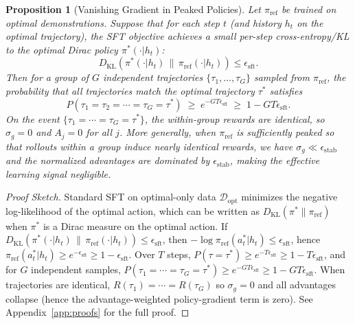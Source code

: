 \documentclass{article}
\theoremstyle{plain}
\newtheorem{proposition}[theorem]{Proposition}
\theoremstyle{definition}
\theoremstyle{remark}
\begin{document}
\begin{proposition}[Vanishing Gradient in Peaked Policies]
\label{prop:collapse}
Let $\pi_{\text{ref}}$ be trained on optimal demonstrations. Suppose that for each step $t$ (and history $h_t$ on the optimal trajectory), the SFT objective achieves a small per-step cross-entropy/KL to the optimal Dirac policy $\pi^*(\cdot|h_t)$:
\begin{equation}
    D_{\text{KL}}(\pi^*(\cdot|h_t)\,\|\,\pi_{\text{ref}}(\cdot|h_t)) \le \epsilon_{\text{sft}} .
\end{equation}
Then for a group of $G$ independent trajectories $\{\tau_1, \dots, \tau_G\}$ sampled from $\pi_{\text{ref}}$, the probability that all trajectories match the optimal trajectory $\tau^*$ satisfies
\begin{equation}
P(\tau_1 = \tau_2 = \cdots = \tau_G = \tau^*) \;\ge\; e^{-GT\epsilon_{\text{sft}}} \;\ge\; 1 - GT\epsilon_{\text{sft}}.
\end{equation}
On the event $\{\tau_1 = \cdots = \tau_G = \tau^*\}$, the within-group rewards are identical, so $\sigma_g = 0$ and $A_j = 0$ for all $j$. More generally, when $\pi_{\text{ref}}$ is sufficiently peaked so that rollouts within a group induce nearly identical rewards, we have $\sigma_g \ll \epsilon_{\text{stab}}$ and the normalized advantages are dominated by $\epsilon_{\text{stab}}$, making the effective learning signal negligible.
\end{proposition}

\begin{proof}[Proof Sketch]
Standard SFT on optimal-only data $\mathcal{D}_{\text{opt}}$ minimizes the negative log-likelihood of the optimal action, which can be written as $D_{\text{KL}}(\pi^* \| \pi_{\text{ref}})$ when $\pi^*$ is a Dirac measure on the optimal action. If $D_{\text{KL}}(\pi^*(\cdot|h_t)\,\|\,\pi_{\text{ref}}(\cdot|h_t)) \le \epsilon_{\text{sft}}$, then $-\log \pi_{\text{ref}}(a_t^*|h_t) \le \epsilon_{\text{sft}}$, hence $\pi_{\text{ref}}(a_t^*|h_t) \ge e^{-\epsilon_{\text{sft}}} \ge 1-\epsilon_{\text{sft}}$. Over $T$ steps, $P(\tau=\tau^*) \ge e^{-T\epsilon_{\text{sft}}} \ge 1-T\epsilon_{\text{sft}}$, and for $G$ independent samples, $P(\tau_1=\cdots=\tau_G=\tau^*) \ge e^{-GT\epsilon_{\text{sft}}} \ge 1-GT\epsilon_{\text{sft}}$. When trajectories are identical, $R(\tau_1)=\cdots=R(\tau_G)$ so $\sigma_g=0$ and all advantages collapse (hence the advantage-weighted policy-gradient term is zero). See Appendix~\ref{app:proofs} for the full proof.
\end{proof}
\end{document}
